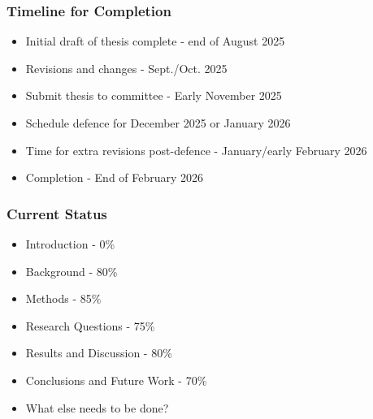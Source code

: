 \documentclass[t]{beamer}
\begin{document}
\begin{frame}
	\frametitle{Timeline for Completion}
	\begin{itemize}
    	\item Initial draft of thesis complete - end of August 2025
    	\item Revisions and changes - Sept./Oct. 2025
    	\item Submit thesis to committee - Early November 2025
    	\item Schedule defence for December 2025 or January 2026
    	\item Time for extra revisions post-defence - January/early February 2026
    	\item Completion - End of February 2026
	\end{itemize}
\end{frame}

\begin{frame}
	\frametitle{Current Status}
	\begin{itemize}
		\item Introduction - 0\%
		\item Background - 80\%
		\item Methods - 85\%
		\item Research Questions - 75\%
		\item Results and Discussion - 80\%
		\item Conclusions and Future Work - 70\%
		\item What else needs to be done?
	\end{itemize}
\end{frame}
\end{document}
